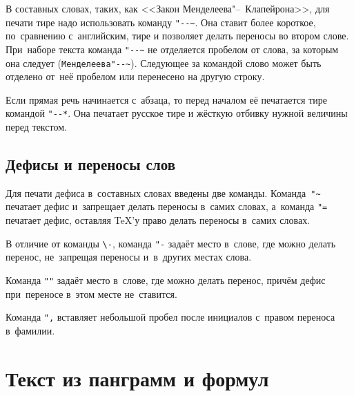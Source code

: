 В составных словах, таких, как <<Закон Менделеева"--~Клапейрона>>, для печати тире надо использовать команду \verb|"--~|. Она ставит более короткое, по~сравнению с~английским, тире и позволяет делать переносы во втором слове. При~наборе текста команда \verb|"--~| не отделяется пробелом от слова, за которым она следует (\verb|Менделеева"--~|). Следующее за командой слово может быть  отделено от~неё пробелом или перенесено на другую строку.

Если прямая речь начинается с~абзаца, то перед началом её печатается тире командой
\verb|"--*|. Она печатает русское тире и жёсткую отбивку нужной величины перед текстом.

\subsection{Дефисы и переносы слов}
Для печати дефиса в~составных словах введены две команды. Команда~\verb|"~| печатает дефис и~запрещает делать переносы в~самих словах, а~команда \verb|"=| печатает дефис, оставляя \TeX ’у право делать переносы в~самих словах.

В отличие от команды \verb|\-|, команда \verb|"-| задаёт место в~слове, где можно делать перенос, не~запрещая переносы и~в~других местах слова.

Команда \verb|""| задаёт место в~слове, где можно делать перенос, причём дефис при~переносе в~этом месте не~ставится.

Команда \verb|",| вставляет небольшой пробел после инициалов с~правом переноса в~фамилии.

\section{Текст из панграмм и формул}

